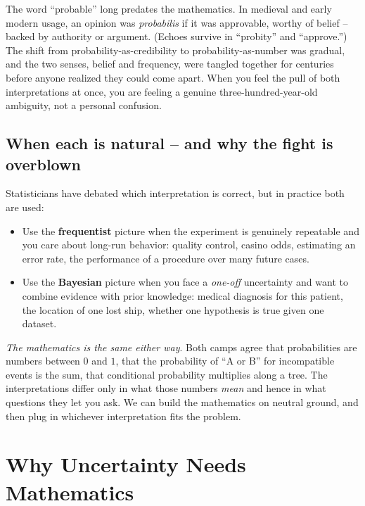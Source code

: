 \begin{marginnotebox}
The word ``probable'' long predates the mathematics. In medieval and early modern
usage, an opinion was \emph{probabilis} if it was approvable, worthy of belief --
backed by authority or argument. (Echoes survive in ``probity'' and ``approve.'')
The shift from probability-as-credibility to probability-as-number was gradual,
and the two senses, belief and frequency, were tangled together for centuries
before anyone realized they could come apart. When you feel the pull of both
interpretations at once, you are feeling a genuine three-hundred-year-old
ambiguity, not a personal confusion.
\end{marginnotebox}

\subsection{When each is natural -- and why the fight is overblown}
\label{ch01:which-when}

Statisticians have debated which interpretation is correct, but in practice both are used:

\begin{itemize}
\item Use the \textbf{frequentist} picture when the experiment is genuinely
repeatable and you care about long-run behavior: quality control, casino odds,
estimating an error rate, the performance of a procedure over many future cases.
\item Use the \textbf{Bayesian} picture when you face a \emph{one-off} uncertainty
and want to combine evidence with prior knowledge: medical diagnosis for this
patient, the location of one lost ship, whether one hypothesis is true given one
dataset.
\end{itemize}

\begin{aestheticbox}
\emph{The mathematics is the same either way}. Both camps agree that
probabilities are numbers between $0$ and $1$, that the probability of ``A or B''
for incompatible events is the sum, that conditional probability multiplies along
a tree. The interpretations differ only in what those numbers \emph{mean} and
hence in what questions they let you ask. We can build the mathematics on neutral ground, and then plug in whichever interpretation fits the problem.
\end{aestheticbox}

\section{Why Uncertainty Needs Mathematics}
\label{ch01:why-math}

